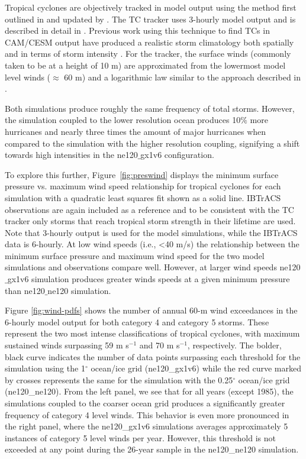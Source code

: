 \documentclass[draft,ms]{AGUTeX}
\newcommand{\degree}{$^{\circ}$}
\begin{document}
\begin{article}
Tropical cyclones are objectively tracked in model output using the method first outlined in \citet{Vitart1997} and updated by \citet{Knutson2007}. The TC tracker uses 3-hourly model output and is described in detail in \citet{Zhao2009}. Previous work using this technique to find TCs in CAM/CESM output have produced a realistic storm climatology both spatially and in terms of storm intensity \citet{Wehner2014}. For the tracker, the surface winds (commonly taken to be at a height of 10 m) are approximated from the lowermost model level winds ($\approx$ 60 m) and a logarithmic law similar to the approach described in \citet{Zarzycki2014AMIPTCs}.

Both simulations produce roughly the same frequency of total storms.  However, the simulation coupled to the lower resolution ocean produces 10$\%$ more hurricanes and nearly three times the amount of major hurricanes when compared to the simulation with the higher resolution coupling, signifying a shift towards high intensities in the ne120$\_$gx1v6 configuration.

To explore this further, Figure~\ref{fig:preswind} displays the minimum surface pressure vs. maximum wind speed relationship for tropical cyclones for each simulation with a quadratic least squares fit shown as a solid line. IBTrACS observations are again included as a reference and to be consistent with the TC tracker only storms that reach tropical storm strength in their lifetime are used. Note that 3-hourly output is used for the model simulations, while the IBTrACS data is 6-hourly. At low wind speeds (i.e., \textless 40 m/s) the relationship between the minimum surface pressure and maximum wind speed for the two model simulations and observations compare well.  However, at larger wind speeds ne120$\_$gx1v6 simulation produces greater winds speeds at a given minimum pressure than ne120$\_$ne120 simulation.

Figure \ref{fig:wind-pdfs} shows the number of annual 60-m wind exceedances in the 6-hourly model output for both category 4 and category 5 storms. These represent the two most intense classifications of tropical cyclones, with maximum sustained winds surpassing 59 m s$^{-1}$ and 70 m s$^{-1}$, respectively. The bolder, black curve indicates the number of data points surpassing each threshold for the simulation using the 1\degree{} ocean/ice grid (ne120\_gx1v6) while the red curve marked by crosses represents the same for the simulation with the 0.25\degree{} ocean/ice grid (ne120\_ne120). From the left panel, we see that for all years (except 1985), the simulations coupled to the coarser ocean grid produces a significantly greater frequency of category 4 level winds. This behavior is even more pronounced in the right panel, where the ne120\_gx1v6 simulations averages approximately 5 instances of category 5 level winds per year. However, this threshold is not exceeded at any point during the 26-year sample in the ne120\_ne120 simulation.


\end{article}
\end{document}
